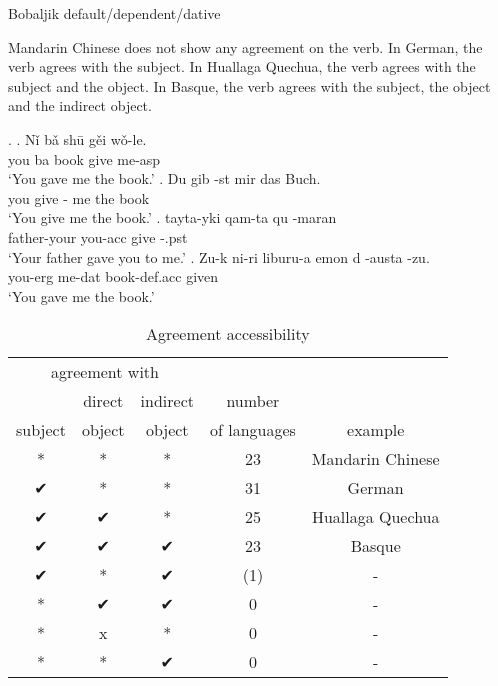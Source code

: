 Bobaljik default/dependent/dative

Mandarin Chinese does not show any agreement on the verb. In German, the verb agrees with the subject. In Huallaga Quechua, the verb agrees with the subject and the object. In Basque, the verb agrees with the subject, the object and the indirect object.


\ex.
\ag. Nǐ bǎ shū gěi wǒ-le.\\
 you ba book give me-\ac{asp}\\
 `You gave me the book.' 
\bg. Du gib -st mir das Buch.\\
 you give - me the book\\
 `You give me the book.' 
\bg. tayta-yki qam-ta qu -maran\\
 father-your you-\ac{acc} give -.\ac{pst}\\
 `Your father gave you to me.' 
\bg. Zu-k ni-ri liburu-a emon d -austa -zu.\\
 you-\ac{erg} me-\ac{dat} book-\ac{def}.\ac{acc} given   \\
 `You gave me the book.' 

\begin{table}[H]
  \center
  \caption {Agreement accessibility}
    \begin{tabular}[t]{ccccc}
      \toprule
            \multicolumn{3}{c}{agreement with}
            &
          & \\
      \cmidrule{1-3}
            & direct
            & indirect
            & number
          & \\
            subject
            & object
            & object
            & of languages
          & example \\
      \cmidrule{1-3} \cmidrule{4-4} \cmidrule{5-5}
            *
            & *
            & *
            & 23
          & Mandarin Chinese \\
            ✔
            & *
            & *
            & 31
          & German \\
            ✔
            & ✔
            & *
            & 25
          & Huallaga Quechua \\
            ✔
            & ✔
            & ✔
            & 23
          & Basque \\
            ✔
            & *
            & ✔
            & (1)
          & - \\
            {*}
            & ✔
            & ✔
            & 0
          & - \\
            {*}
            & x
            & *
            & 0
          & - \\
            {*}
            & *
            & ✔
            & 0
          & - \\
      \bottomrule
    \end{tabular}
\end{table}



